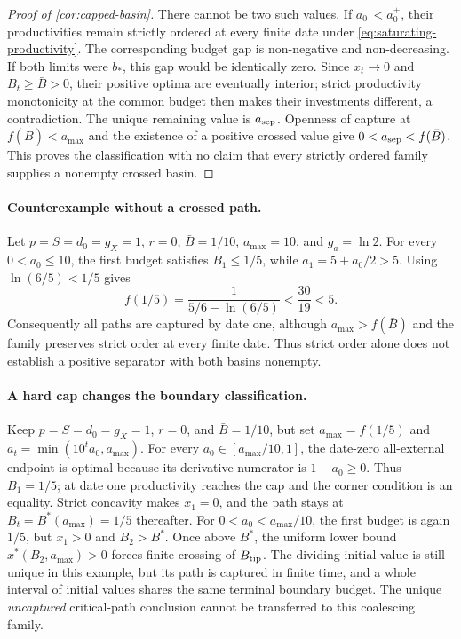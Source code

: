 \begin{proof}[Proof of \cref{cor:capped-basin}]
There cannot be two such values. If $a_0^-<a_0^+$, their productivities
remain strictly ordered at every finite date under
\cref{eq:saturating-productivity}. The corresponding budget gap is
non-negative and non-decreasing. If both limits were $b_*$, this gap
would be identically zero. Since $x_t\to0$ and $B_t\geq\bar B>0$,
their positive optima are eventually interior; strict productivity
monotonicity at the common budget then makes their investments different,
a contradiction. The unique remaining value is $a_{\rm sep}$.
Openness of capture at $f(\bar B)<a_{\max}$ and the existence of a
positive crossed value give $0<a_{\rm sep}<f(\bar B)$.
This proves the classification with no claim that every strictly ordered
family supplies a nonempty crossed basin.
\end{proof}

\paragraph{Counterexample without a crossed path.}
Let $p=S=d_0=g_X=1$, $r=0$, $\bar B=1/10$, $a_{\max}=10$,
and $g_a=\ln2$. For every $0<a_0\leq10$, the first budget satisfies
$B_1\leq1/5$, while $a_1=5+a_0/2>5$.
Using $\ln(6/5)<1/5$ gives
\[
 f(1/5)=\frac1{5/6-\ln(6/5)}<\frac{30}{19}<5.
\]
Consequently all paths are captured by date one, although
$a_{\max}>f(\bar B)$ and the family preserves strict order at every
finite date. Thus strict order alone does not establish a positive
separator with both basins nonempty.

\paragraph{A hard cap changes the boundary classification.}
Keep $p=S=d_0=g_X=1$, $r=0$, and $\bar B=1/10$, but set
$a_{\max}=f(1/5)$ and $a_t=\min(10^ta_0,a_{\max})$.
For every $a_0\in[a_{\max}/10,1]$, the date-zero all-external endpoint
is optimal because its derivative numerator is $1-a_0\geq0$.
Thus $B_1=1/5$; at date one productivity reaches the cap and the corner
condition is an equality. Strict concavity makes $x_1=0$, and the path
stays at $B_t=B^*(a_{\max})=1/5$ thereafter.
For $0<a_0<a_{\max}/10$, the first budget is again $1/5$, but
$x_1>0$ and $B_2>B^*$. Once above $B^*$, the uniform lower bound
$x^*(B_2,a_{\max})>0$ forces finite crossing of $B_{\rm tip}$.
The dividing initial value is still unique in this example, but its
path is captured in finite time, and a whole interval of initial values
shares the same terminal boundary budget. The unique \emph{uncaptured}
critical-path conclusion cannot be transferred to this coalescing family.

